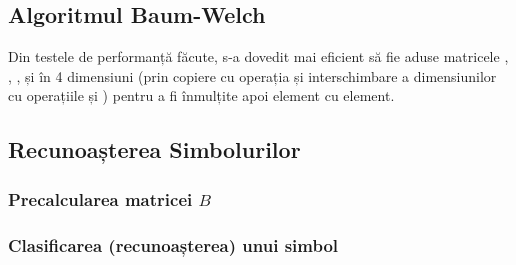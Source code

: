 \documentclass[12pt]{article}
\begin{document}
\subsection{Algoritmul Baum-Welch}
\label{sec:baum-welch-sol}

Din testele de performanță făcute, s-a dovedit mai eficient să fie
aduse matricele , , ,  și
 în 4 dimensiuni (prin copiere cu operația 
și interschimbare a dimensiunilor cu operațiile  și
) pentru a fi înmulțite apoi element cu element.



\subsection{Recunoașterea Simbolurilor}
\label{sec:symbol-recognition-sol}


\subsubsection{Precalcularea matricei $B$}
\label{sec:precomp-b-sol}



\subsubsection{Clasificarea (recunoașterea) unui simbol}
\label{sec:classify-sol}


\end{document}
